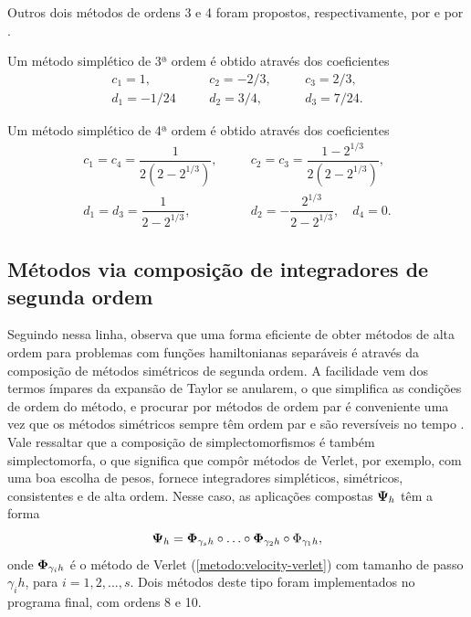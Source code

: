 Outros dois métodos de ordens 3 e 4 foram propostos, respectivamente, por \cite{Ruth1983} e por \cite{Forest1990}.

\begin{method}[Ruth 3]\label{metodo:ruth3}
    Um método simplético de 3ª ordem é obtido através dos coeficientes
    \begin{align*}
        c_1 = 1,    & \quad & c_2 = -2/3, & \quad & c_3 = 2/3, \\
        d_1 = -1/24 & \quad & d_2 = 3/4,  & \quad & d_3 = 7/24.
    \end{align*}
\end{method}

\begin{method}[Ruth 4]\label{metodo:ruth4}
    Um método simplético de 4ª ordem é obtido através dos coeficientes
    \begin{align*}
        c_1 = c_4 = \dfrac{1}{2(2-2^{1/3})}, & \quad & c_2 = c_3 = \dfrac{1-2^{1/3}}{2(2-2^{1/3})}, \\
        d_1 = d_3 = \dfrac{1}{2-2^{1/3}}, & \quad & d_2 = - \dfrac{2^{1/3}}{2-2^{1/3}}, \quad d_4 = 0.
    \end{align*}
\end{method}


\subsection{Métodos via composição de integradores de segunda ordem}
Seguindo nessa linha, \cite{Yoshida1990} observa que uma forma eficiente de obter métodos de alta ordem para problemas com funções hamiltonianas separáveis é através da composição de métodos simétricos de segunda ordem. A facilidade vem dos termos ímpares da expansão de Taylor se anularem, o que simplifica as condições de ordem do método, e procurar por métodos de ordem par é conveniente uma vez que os métodos simétricos sempre têm ordem par e são reversíveis no tempo \citep[147]{Leimkuhler2005}. Vale ressaltar que a composição de simplectomorfismos é também simplectomorfa, o que significa que compôr métodos de Verlet, por exemplo, com uma boa escolha de pesos, fornece integradores simpléticos, simétricos, consistentes e de alta ordem. Nesse caso, as aplicações compostas $\bm \Psi_h$ têm a forma
\begin{equation*}
    \bm \Psi_h = \bm \Phi_{\gamma_s h} \circ \hdots \circ \bm \Phi_{\gamma_2 h} \circ \Phi_{\gamma_1 h},
\end{equation*}
onde $\bm \Phi_{\gamma_i h}$ é o método de Verlet (\ref{metodo:velocity-verlet}) com tamanho de passo $\gamma_i h$, para $i=1,2,...,s$. Dois métodos deste tipo foram implementados no programa final, com ordens 8 e 10.

